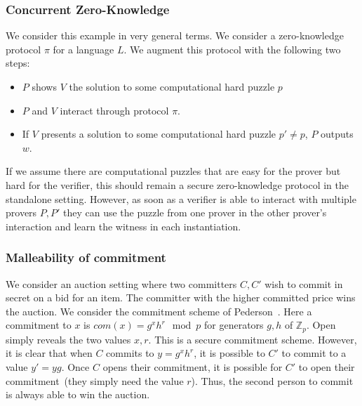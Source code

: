 \documentclass{article}
\begin{document}
\subsubsection{Concurrent Zero-Knowledge}
We consider this example in very general terms.  We consider a zero-knowledge protocol $\pi$ for a language $L$.  We augment this protocol with the following two steps:

\begin{itemize}
\item $P$ shows $V$ the solution to some computational hard puzzle $p$
\item $P$ and $V$ interact through protocol $\pi$.
\item If $V$ presents a solution to some computational hard puzzle $p'\neq p$, $P$ outputs $w$.
\end{itemize}

If we assume there are computational puzzles that are easy for the prover but hard for the verifier, this should remain a secure zero-knowledge protocol in the standalone setting.  However, as soon as a verifier is able to interact with multiple provers $P, P'$ they can use the puzzle from one prover in the other prover's interaction and learn the witness in each instantiation.

\subsubsection{Malleability of commitment}
We consider an auction setting where two committers $C, C'$ wish to commit in secret on a bid for an item.  The committer with the higher committed price wins the auction.  We consider the commitment scheme of Pederson~\cite{Pedersen:1992fk}.  Here a commitment to $x$ is $com(x) = g^xh^r\mod p$ for generators $g, h$ of $\mathbb{Z}_p$.  Open simply reveals the two values $x, r$.  This is a secure commitment scheme.  However, it is clear that when $C$ commits to $y = g^xh^r$, it is possible to $C'$ to commit to a value $y'= yg$.  Once $C$ opens their commitment, it is possible for $C'$ to open their commitment~(they simply need the value $r$).  Thus, the second person to commit is always able to win the auction.
\end{document}
